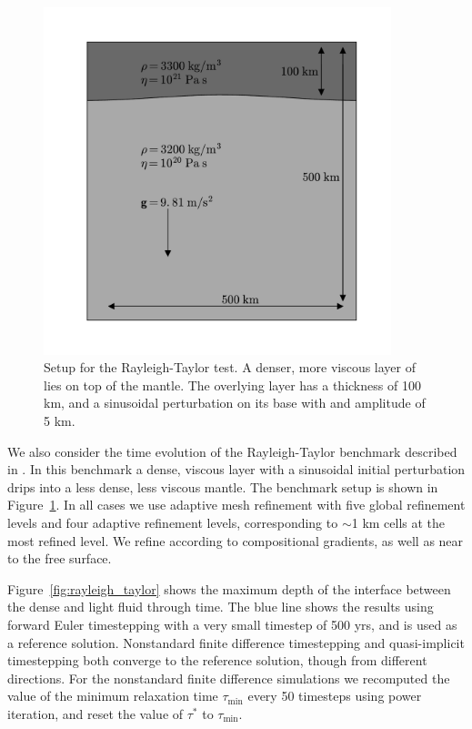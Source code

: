 \documentclass[preprint,12pt,authoryear]{elsarticle}
\begin{document}
\begin{figure}
\includegraphics[width=0.9\textwidth]{figures/rayleigh_taylor_setup.pdf}
\caption[Setup for the Rayleigh-Taylor test.]{Setup for the Rayleigh-Taylor test. A denser, more viscous layer of lies on top of the mantle. The overlying layer has a thickness of 100 km, and a sinusoidal perturbation on its base with and amplitude of 5 km.}
\label{fig:rayleigh_taylor_setup}
\end{figure}

We also consider the time evolution of the Rayleigh-Taylor benchmark described in \citet{kaus2010stabilization}.
In this benchmark a dense, viscous layer with a sinusoidal initial perturbation drips into a less dense, less viscous mantle.
The benchmark setup is shown in Figure~\ref{fig:rayleigh_taylor_setup}.
In all cases we use adaptive mesh refinement with five global refinement levels and four adaptive refinement levels,
corresponding to $\sim$1 km cells at the most refined level. We refine according to compositional gradients, as well as
near to the free surface.

Figure~\ref{fig:rayleigh_taylor} shows the maximum depth of the interface between the dense and light fluid through time.
The blue line shows the results using forward Euler timestepping with a very small timestep of 500 yrs, and is used as a reference solution.
Nonstandard finite difference timestepping and quasi-implicit timestepping both converge to the reference solution,
though from different directions.
For the nonstandard finite difference simulations we recomputed the value of the minimum relaxation time $\tau_\mathrm{min}$ 
every 50 timesteps using power iteration, and reset the value of $\tau^*$ to $\tau_\mathrm{min}$.
\end{document}
